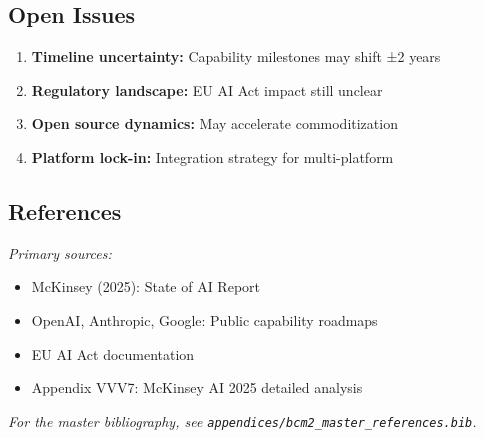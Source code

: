 
\subsection{Open Issues}

\begin{enumerate}
    \item \textbf{Timeline uncertainty:} Capability milestones may shift ±2 years
    \item \textbf{Regulatory landscape:} EU AI Act impact still unclear
    \item \textbf{Open source dynamics:} May accelerate commoditization
    \item \textbf{Platform lock-in:} Integration strategy for multi-platform
\end{enumerate}


\subsection{References}

\noindent\textit{Primary sources:}

\begin{itemize}[nosep]
    \item McKinsey (2025): State of AI Report
    \item OpenAI, Anthropic, Google: Public capability roadmaps
    \item EU AI Act documentation
    \item Appendix VVV7: McKinsey AI 2025 detailed analysis
\end{itemize}

\noindent\textit{For the master bibliography, see \texttt{appendices/bcm2\_master\_references.bib}.}



\nocite{bcm_master}



